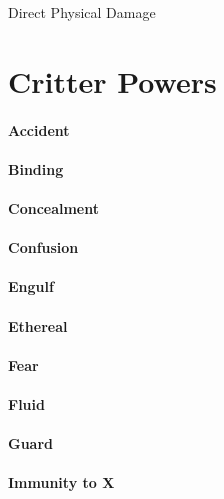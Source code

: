 \hfil

Direct Physical Damage

\section{Critter Powers}

\paragraph{Accident}

\paragraph{Binding}

\paragraph{Concealment}


\paragraph{Confusion}

\paragraph{Engulf}

\paragraph{Ethereal}


\paragraph{Fear}



\paragraph{Fluid}


\paragraph{Guard}

\paragraph{Immunity to X}



